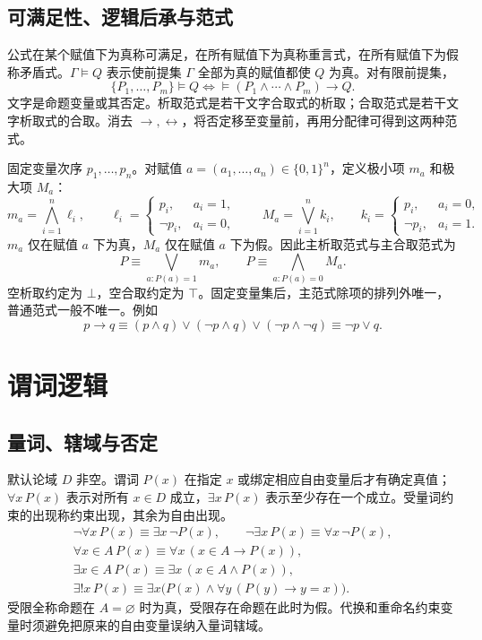 \documentclass[../main.tex]{subfiles}
\begin{document}
\subsection{可满足性、逻辑后承与范式}
公式在某个赋值下为真称可满足，在所有赋值下为真称重言式，在所有赋值下为假称矛盾式。$\Gamma\models Q$ 表示使前提集 $\Gamma$ 全部为真的赋值都使 $Q$ 为真。对有限前提集，
\[
\{P_1,\ldots,P_m\}\models Q
\iff\models(P_1\land\cdots\land P_m)\to Q.
\]
文字是命题变量或其否定。析取范式是若干文字合取式的析取；合取范式是若干文字析取式的合取。消去 $\to,\leftrightarrow$，将否定移至变量前，再用分配律可得到这两种范式。

固定变量次序 $p_1,\ldots,p_n$。对赋值 $a=(a_1,\ldots,a_n)\in\{0,1\}^n$，定义极小项 $m_a$ 和极大项 $M_a$：
\[
m_a=\bigwedge_{i=1}^n\ell_i,\qquad
\ell_i=\begin{cases}p_i,&a_i=1,\\\neg p_i,&a_i=0,\end{cases}
\qquad
M_a=\bigvee_{i=1}^n k_i,\qquad
k_i=\begin{cases}p_i,&a_i=0,\\\neg p_i,&a_i=1.\end{cases}
\]
$m_a$ 仅在赋值 $a$ 下为真，$M_a$ 仅在赋值 $a$ 下为假。因此主析取范式与主合取范式为
\[
P\equiv\bigvee_{a:P(a)=1}m_a,\qquad
P\equiv\bigwedge_{a:P(a)=0}M_a.
\]
空析取约定为 $\bot$，空合取约定为 $\top$。固定变量集后，主范式除项的排列外唯一，普通范式一般不唯一。例如
\[
p\to q\equiv(p\land q)\lor(\neg p\land q)\lor(\neg p\land\neg q)
\equiv\neg p\lor q.
\]

\section{谓词逻辑}
\subsection{量词、辖域与否定}
默认论域 $D$ 非空。谓词 $P(x)$ 在指定 $x$ 或绑定相应自由变量后才有确定真值；$\forall x\,P(x)$ 表示对所有 $x\in D$ 成立，$\exists x\,P(x)$ 表示至少存在一个成立。受量词约束的出现称约束出现，其余为自由出现。
\begin{gather*}
\neg\forall x\,P(x)\equiv\exists x\,\neg P(x),\qquad
\neg\exists x\,P(x)\equiv\forall x\,\neg P(x),\\
\forall x\in A\,P(x)\equiv\forall x\,(x\in A\to P(x)),\\
\exists x\in A\,P(x)\equiv\exists x\,(x\in A\land P(x)),\\
\exists!x\,P(x)\equiv\exists x\bigl(P(x)\land\forall y\,(P(y)\to y=x)\bigr).
\end{gather*}
受限全称命题在 $A=\varnothing$ 时为真，受限存在命题在此时为假。代换和重命名约束变量时须避免把原来的自由变量误纳入量词辖域。
\end{document}
